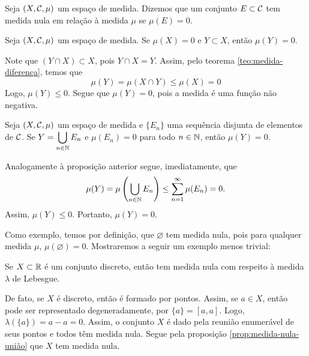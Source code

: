 \begin{definition}
	\label{def:conjunto-medida-nula}
	Seja $(X, \operatorname{\mathcal{C}}, \mu)$ um espaço de medida.
	Dizemos que um conjunto $E \subset \operatorname{\mathcal{C}}$ tem medida nula em relação à medida $\mu$ se $\mu(E) = 0$.
\end{definition}

\begin{proposition}
	\label{prop:medida-nula-subconjunto}
	Seja $(X, \operatorname{\mathcal{C}}, \mu)$ um espaço de medida.
	Se $\mu(X) = 0$ e $Y \subset X$, então $\mu(Y) = 0$.
\end{proposition}
\begin{prova}
	Note que $(Y \cap X) \subset X$, pois $ Y \cap X = Y$.
	Assim, pelo teorema \ref{teo:medida-diferença}, temos que
	$$
	\mu(Y) = \mu(X \cap Y) \leq \mu(X) = 0
	$$
	Logo, $\mu(Y) \leq 0$.
	Segue que $\mu(Y) = 0$, pois a medida é uma função não negativa.
\end{prova}

\begin{proposition}
	\label{prop:medida-nula-união}
	Seja $(X, \operatorname{\mathcal{C}}, \mu)$ um espaço de medida e $\{E_n\}$ uma sequência disjunta de elementos de $\operatorname{\mathcal{C}}$.
	Se $Y = \displaystyle\bigcup_{n \in \operatorname{\mathbb{N}}}E_n$ e $\mu(E_n) = 0$ para todo $n \in \operatorname{\mathbb{N}}$, então $\mu(Y) = 0$.
\end{proposition}
\begin{prova}
	Analogamente à proposição anterior segue, imediatamente, que
	$$
	\mu(Y)
	=
	\mu\left(\bigcup_{n \in \operatorname{\mathbb{N}}}E_n\right)
	\leq
	\sum_{n = 1}^\infty \mu(E_n)
	= 0.
	$$
	Assim,
	$\mu(Y)\leq 0$. Portanto, $\mu(Y) = 0$.
\end{prova}

Como exemplo, temos por definição, que $\varnothing$ tem medida nula, pois para qualquer medida $\mu$, $\mu(\varnothing) = 0$.
Mostraremos a seguir um exemplo menos trivial:

\begin{example}
	Se $X \subset \mathbb{R}$ é um conjunto discreto, então tem medida nula com respeito à medida $\lambda$ de Lebesgue.
\end{example}

De fato, se $X$ é discreto, então é formado por pontos.
Assim, se $a \in X$, então pode ser representado degeneradamente, por 
$\{a\} = [a,a]$.
Logo, $\lambda(\{a\}) = a - a = 0$.
Assim, o conjunto $X$ é dado pela reunião enumerável de seus pontos e todos têm medida nula. 
Segue pela proposição \ref{prop:medida-nula-união} que $X$ tem medida nula.
 


